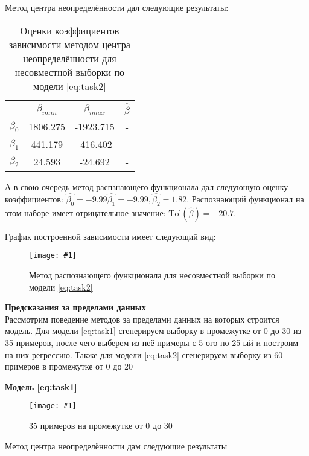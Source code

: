 \documentclass[a4paper,12pt]{article}
\newcommand{\plot}[3]{
    \begin{figure}[H]
        \texttt{[image: \#1]}
        \caption{#2}
        \label{#3}
    \end{figure}
}
\begin{document}
    \noindent Метод центра неопределённости дал следующие результаты:
    \begin{table}[H]
        \begin{center}
            \begin{tabular}{| c | c | c | c |}
                \hline
                & $ \beta_{imin} $ & $ \beta_{imax} $ & $ \hat{\beta} $ \\
                \hline
                $ \beta_{0} $ & 1806.275 & -1923.715 & - \\
                \hline
                $ \beta_{1} $ & 441.179 & -416.402 & - \\
                \hline
                $ \beta_{2} $ & 24.593 & -24.692 & - \\
                \hline
            \end{tabular}
        \end{center}
        \caption{Оценки коэффициентов зависимости методом центра неопределённости для несовместной выборки по модели \ref{eq:task2}}
        \label{t:estimdata50}
    \end{table}

    \noindent А в свою очередь метод распзнающего функционала дал следующую оценку коэффициентов:
    $ \hat{\beta_0} = -9.99 \hat{\beta_{1}} = -9.99, \hat{\beta_{2}} = 1.82 $.
    Распознающий функционал на этом наборе имеет отрицательное значение: $ \text{Tol}(\hat{\beta}) = -20.7 $.

    \noindent График построенной зависимости имеет следующий вид:
    \plot{TolDataWithEstims50}{Метод распознающего функционала для несовместной выборки по модели \ref{eq:task2}}{p:tolestimdata50}
    
    \newpage
    \noindent\textbf{Предсказания за пределами данных} \\
     Рассмотрим поведение методов за пределами данных на которых строится модель.
    Для модели \ref{eq:task1} сгенерируем выборку в промежутке от 0 до 30 из 35 примеров, после чего выберем из неё примеры с 5-ого по 25-ый и построим на них регрессию.
    Также для модели \ref{eq:task2} сгенерируем выборку из 60 примеров в промежутке от 0 до 20
    
    \noindent\textbf{Модель \ref{eq:task1}}
    
    \plot{None35}{35 примеров на промежутке от 0 до 30}{p:tolestimdata50}
    
    \newpage
    
    Метод центра неопределённости дам следующие результаты
    
\end{document}
